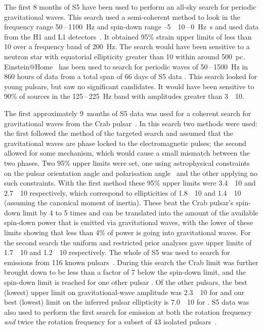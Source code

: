 The first 8 months of S5 have been used to perform an all-sky search for periodic gravitational waves. This 
search used a semi-coherent method to look in the frequency range 50\,--\,1100~Hz and spin-down range
--5~\texttimes~10\,--\,0~Hz~s and used data from the H1 and L1 
detectors~\cite{Abbott:2008i}. It obtained 95\% strain upper limits of less than 10 over a 
frequency band of 200~Hz. The search would have been sensitive to a neutron star with equatorial ellipticity 
greater than 10 within around 500~pc. Einstein@Home~\cite{eath} has been used to search for periodic
waves of 50\,--\,1500~Hz in 860 hours of data from a total span of 66 days of S5 data \cite{Abbott:2009a}. 
This search looked for young pulsars, but saw no significant candidates. It would have been sensitive to 90\% 
of sources in the 125\,--\,225~Hz band with amplitudes greater than 3~\texttimes~10.

The first approximately 9~months of S5 data was used for a coherent search for gravitational waves from the 
Crab pulsar~\cite{Abbott:2008j}. In this search two methods were used: the first followed the method of the 
targeted search and assumed that the gravitational waves are phase locked to the electromagnetic pulses; the 
second allowed for some mechanism, which would cause a small mismatch between the two phases. Two 95\%
upper limits were set, one using astrophysical constraints on the pulsar orientation angle and polarisation 
angle~\cite{Ng:2008} and the other applying no such constraints. With the first method these 95\%
upper limits were 3.4~\texttimes~10 and 2.7~\texttimes~10 respectively, which 
correspond to ellipticities of 1.8~\texttimes~10 and 1.4~\texttimes~10 (assuming the 
canonical moment of inertia). These beat the Crab pulsar's spin-down limit by 4 to 5 times and can be 
translated into the amount of the available spin-down power that is emitted via gravitational waves, with the
lower of these limits showing that less than 4\% of power is going into gravitational waves. For the second 
search the uniform and restricted prior analyses gave upper limits of 1.7~\texttimes~10 and 
1.2~\texttimes~10 respectively. The whole of S5 was used to search for emissions from 116 known
pulsars~\cite{Abbott:2010a}. During this search the Crab limit was further brought down to be less than a 
factor of 7 below the spin-down limit, and the spin-down limit is reached for one other pulsar 
. Of the other pulsars, the best (lowest) upper limit on gravitational-wave 
amplitude was 2.3~\texttimes~10 for  and our best (lowest) limit on 
the inferred pulsar ellipticity is 7.0~\texttimes~10 for . S5 data 
was also used to perform the first search for emission at both the rotation frequency \textit{and} 
twice the rotation frequency for a subset of 43 isolated pulsars~\cite{2015MNRAS.453.4399P}.

